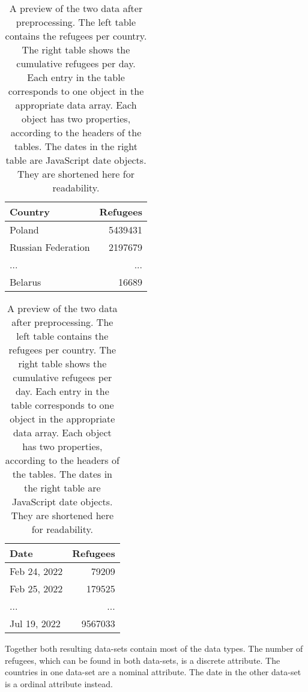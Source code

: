\begin{table}
    \centering
    \begin{tabular}{l|r}
        Country & Refugees \\
        \hline \hline
        Poland & 5439431 \\
        Russian Federation & 2197679 \\
        ... & ... \\
        Belarus & 16689 \\
    \end{tabular}
    \quad
    \begin{tabular}{l|r}
        Date & Refugees \\
        \hline \hline
        Feb 24, 2022 & 79209 \\
        Feb 25, 2022 & 179525 \\
        ... & ... \\
        Jul 19, 2022 & 9567033 \\
    \end{tabular}
    \captionsetup{width=0.9\textwidth}
    \caption{A preview of the two data after preprocessing. The left table contains the refugees per country. The right table shows the cumulative refugees per day. Each entry in the table corresponds to one object in the appropriate data array. Each object has two properties, according to the headers of the tables. The dates in the right table are JavaScript date objects. They are shortened here for readability.}
    \label{tab:data}
\end{table}


Together both resulting data-sets contain most of the data types. The number of refugees, which can be found in both data-sets, is a discrete attribute. The countries in one data-set are a nominal attribute. The date in the other data-set is a ordinal attribute instead.




